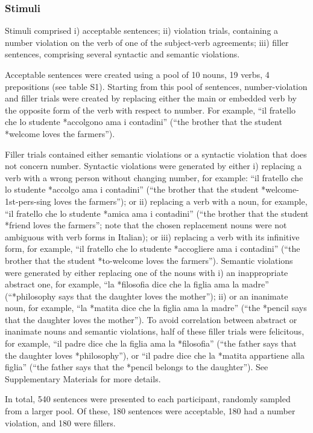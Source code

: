 \subsubsection{Stimuli}
Stimuli comprised i) acceptable sentences; ii) violation trials, containing a number violation on the verb of one of the subject-verb agreements; iii) filler sentences, comprising several syntactic and semantic violations. 

Acceptable sentences were created using a pool of 10 nouns, 19 verbs, 4 prepositions (see table S1).
Starting from this pool of sentences, number-violation and filler trials were created by replacing either the main or embedded verb by the opposite form of the verb with respect to number. For example, ``il fratello che lo studente *accolgono ama i contadini'' (``the brother that the student *welcome loves the farmers'').

Filler trials contained either semantic violations or a syntactic violation that does not concern number. Syntactic violations were generated by either i) replacing a verb with a wrong person without changing number, for example: ``il fratello che lo studente *accolgo ama i contadini'' (``the brother that the student *welcome-1st-pers-sing loves the farmers''); or ii) replacing a verb with a noun, for example, ``il fratello che lo studente *amica ama i contadini'' (``the brother that the student *friend loves the farmers''; note that the chosen replacement nouns were not ambiguous with verb forms in Italian); or iii) replacing a verb with its infinitive form, for example, ``il fratello che lo studente *accogliere ama i contadini'' (``the brother that the student *to-welcome loves the farmers''). Semantic violations were generated by either replacing one of the nouns with i) an inappropriate abstract one, for example, ``la *filosofia dice che la figlia ama la madre'' (``*philosophy says that the daughter loves the mother''); ii) or an inanimate noun, for example, ``la *matita dice che la figlia ama la madre'' (``the *pencil says that the daughter loves the mother''). To avoid correlation between abstract or inanimate nouns and semantic violations, half of these filler trials were felicitous, for example, ``il padre dice che la figlia ama la *filosofia'' (``the father says that the daughter loves *philosophy''), or ``il padre dice che la *matita appartiene alla figlia'' (``the father says that the *pencil belongs to the daughter''). See Supplementary Materials for more details.

In total, 540 sentences were presented to each participant, randomly sampled from a larger pool. Of these, 180 sentences were acceptable, 180 had a number violation, and 180 were fillers.

